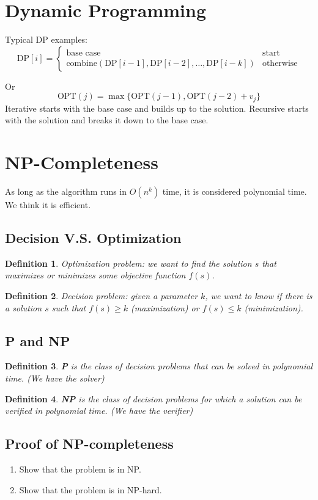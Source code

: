 \documentclass[conference]{IEEEtran}
\newtheorem*{definition}{Definition}
\begin{document}
\section{Dynamic Programming}

Typical DP examples: \[
    \text{DP}[i] = \begin{cases}
        \text{base case} & \text{start} \\
        \text{combine}(\text{DP}[i-1], \text{DP}[i-2], \ldots, \text{DP}[i-k]) & \text{otherwise}
    \end{cases}
\]

Or \[
    \text{OPT}(j) = \max \{ \text{OPT}(j-1), \text{OPT}(j-2) + v_j \}
\]
Iterative starts with the base case and builds up to the solution. Recursive starts with the solution and breaks it down to the base case.

\section{NP-Completeness}
As long as the algorithm runs in $O(n^k)$ time, it is considered polynomial time. We think it is efficient.

\subsection{Decision V.S. Optimization}
\begin{definition}
    Optimization problem: we want to find the solution $s$ that maximizes or minimizes some objective function $f(s)$.
\end{definition}
\begin{definition}
    Decision problem: given a parameter $k$, we want to know if there is a solution $s$ such that $f(s) \geq k$ (maximization) or $f(s) \leq k$ (minimization).
\end{definition}
\subsection{P and NP}
\begin{definition}
    \textbf{P} is the class of decision problems that can be solved in polynomial time. (We have the solver)
\end{definition}
\begin{definition}
    \textbf{NP} is the class of decision problems for which a solution can be verified in polynomial time. (We have the verifier)
\end{definition}
\subsection{Proof of NP-completeness}
\begin{enumerate}
    \item Show that the problem is in NP.
    \item Show that the problem is in NP-hard.
\end{enumerate}
\end{document}
